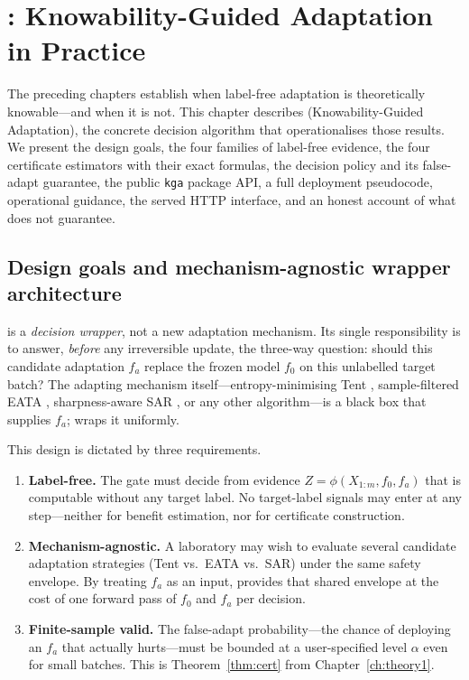 \chapter{\KGA: Knowability-Guided Adaptation in Practice}\label{ch:kga}

The preceding chapters establish when label-free adaptation is theoretically
knowable---and when it is not.  This chapter describes \KGA{}
(Knowability-Guided Adaptation), the concrete decision algorithm that
operationalises those results.  We present the design goals, the four families
of label-free evidence, the four certificate estimators with their exact
formulas, the decision policy and its false-adapt guarantee, the public
\texttt{kga} package API, a full deployment pseudocode, operational guidance,
the served HTTP interface, and an honest account of what \KGA{} does not
guarantee.

\section{Design goals and mechanism-agnostic wrapper architecture}
\label{sec:kga-design}

\KGA{} is a \emph{decision wrapper}, not a new adaptation mechanism.  Its
single responsibility is to answer, \emph{before} any irreversible update, the
three-way question: should this candidate adaptation $f_a$ replace the frozen
model $f_0$ on this unlabelled target batch?  The adapting mechanism
itself---entropy-minimising Tent \cite{wang2021tent}, sample-filtered EATA
\cite{niu2022eata}, sharpness-aware SAR \cite{niu2023sar}, or any other
algorithm---is a black box that supplies $f_a$; \KGA{} wraps it uniformly.

This design is dictated by three requirements.

\begin{enumerate}
  \item \textbf{Label-free.}  The gate must decide from evidence $Z =
    \phi(X_{1:m}, f_0, f_a)$ that is computable without any target label.  No
    target-label signals may enter at any step---neither for benefit estimation,
    nor for certificate construction.

  \item \textbf{Mechanism-agnostic.}  A laboratory may wish to evaluate several
    candidate adaptation strategies (Tent vs.\ EATA vs.\ SAR) under the same
    safety envelope.  By treating $f_a$ as an input, \KGA{} provides that
    shared envelope at the cost of one forward pass of $f_0$ and $f_a$ per
    decision.

  \item \textbf{Finite-sample valid.}  The false-adapt probability---the chance
    of deploying an $f_a$ that actually hurts---must be bounded at a
    user-specified level $\alpha$ even for small batches.  This is
    Theorem~\ref{thm:cert} from Chapter~\ref{ch:theory1}.
\end{enumerate}


